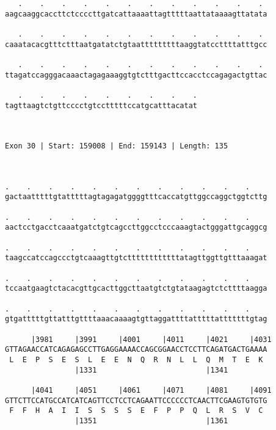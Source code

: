 \documentclass{article}
\begin{document}
\begin{Verbatim}
   .    .    .    .    .    .    .    .    .    .    .    . 
aagcaaggcaccttctccccttgatcattaaaattagtttttaattataaaagttatata
                                                            
   .    .    .    .    .    .    .    .    .    .    .    . 
caaatacacgtttctttaatgatatctgtaatttttttttaaggtatccttttatttgcc
                                                            
   .    .    .    .    .    .    .    .    .    .    .    . 
ttagatccagggacaaactagagaaaggtgtctttgacttccacctccagagactgttac
                                                            
   .    .    .    .    .    .    .    .    .
tagttaagtctgttcccctgtcctttttccatgcatttacatat
                                            
                                            
 
Exon 30 | Start: 159008 | End: 159143 | Length: 135



.    .    .    .    .    .    .    .    .    .    .    .    
gactaatttttgtatttttagtagagatggggtttcaccatgttggccaggctggtcttg
                                                            
.    .    .    .    .    .    .    .    .    .    .    .    
aactcctgacctcaaatgatctgtcagccttggcctcccaaagtactgggattgcaggcg
                                                            
.    .    .    .    .    .    .    .    .    .    .    .    
taagccatccagccctgtcaaagttgtcttttttttttttatagttggttgtttaaagat
                                                            
.    .    .    .    .    .    .    .    .    .    .    .    
tccaatgaagtctacacgttgcacttggcttaatgtctgtataagagtctcttttaagga
                                                            
.    .    .    .    .    .    .    .    .    .    .    .    
gtgatttttgttatttgttttaaacaaaagtgttaggattttatttttatttttttgtag
                                                            
      |3981     |3991     |4001     |4011     |4021     |4031
GTTAGAACCATCAGAGAGCCTTGAGGAAAACCAGCGGAACCTCCTTCAGATGACTGAAAA
 L  E  P  S  E  S  L  E  E  N  Q  R  N  L  L  Q  M  T  E  K 
                |1331                         |1341         
  
      |4041     |4051     |4061     |4071     |4081     |4091
GTTCTTCCATGCCATCATCAGTTCCTCCTCAGAATTCCCCCCTCAACTTCGAAGTGTGTG
 F  F  H  A  I  I  S  S  S  S  E  F  P  P  Q  L  R  S  V  C 
                |1351                         |1361         
  

\end{Verbatim}
\end{document}
